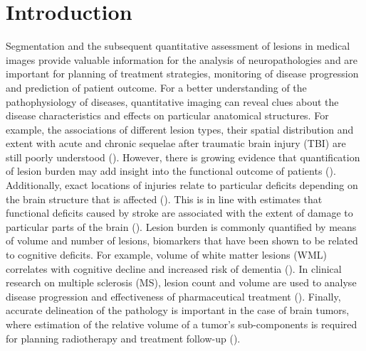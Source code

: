 
\section{Introduction}

Segmentation and the subsequent quantitative assessment of lesions in medical images provide valuable information for the analysis of neuropathologies and are important for planning of treatment strategies, monitoring of disease progression and prediction of patient outcome. For a better understanding of the pathophysiology of diseases, quantitative imaging can reveal clues about the disease characteristics and effects on particular anatomical structures. For example, the associations of different lesion types, their spatial distribution and extent with acute and chronic sequelae after traumatic brain injury (TBI) are still poorly understood (\cite{Maas2015}). However, there is growing evidence that quantification of lesion burden may add insight into the functional outcome of patients (\cite{Ding2008,Moen2012}). Additionally, exact locations of injuries relate to particular deficits depending on the brain structure that is affected (\cite{lehtonen2005neuropsychological, Warner2010d, Sharp2011}). This is in line with estimates that functional deficits caused by stroke are associated with the extent of damage to particular parts of the brain (\cite{carey2013beyond}). Lesion burden is commonly quantified by means of volume and number of lesions, biomarkers that have been shown to be related to cognitive deficits. For example, volume of white matter lesions (WML) correlates with cognitive decline and increased risk of dementia (\cite{Ikram2010}). In clinical research on multiple sclerosis (MS), lesion count and volume are used to analyse disease progression and effectiveness of pharmaceutical treatment (\cite{Rovira2008,Kappos2007}). Finally, accurate delineation of the pathology is important in the case of brain tumors, where estimation of the relative volume of a tumor's sub-components is required for planning radiotherapy and treatment follow-up (\cite{Wen2010}).

